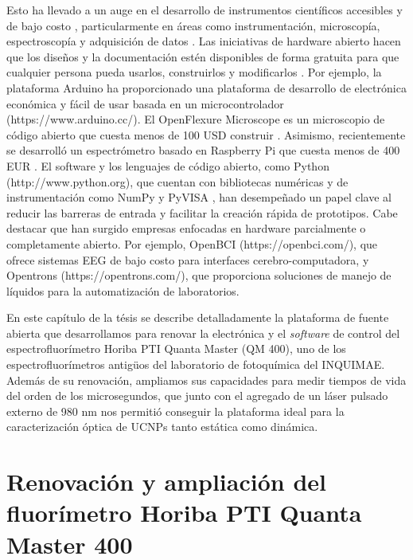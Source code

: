 Esto ha llevado a un auge en el desarrollo de instrumentos científicos accesibles y de bajo costo \cite{wenzel_open_2023, arancio_inequalities_2023}, particularmente en áreas como instrumentación, microscopía, espectroscopía y adquisición de datos \cite{jameson_fluorescent_1989, li_optical_2022, hu_fluorescent_2022}.
Las iniciativas de hardware abierto hacen que los diseños y la documentación estén disponibles de forma gratuita para que cualquier persona pueda usarlos, construirlos y modificarlos \cite{powell_democratizing_2012, oellermann_open_2022}.
Por ejemplo, la plataforma Arduino ha proporcionado una plataforma de desarrollo de electrónica económica y fácil de usar basada en un microcontrolador (https://www.arduino.cc/).
El OpenFlexure Microscope es un microscopio de código abierto que cuesta menos de 100 USD construir \cite{collins_robotic_2020}.
Asimismo, recientemente se desarrolló un espectrómetro basado en Raspberry Pi que cuesta menos de 400 EUR \cite{tunens_optical_2024}.
El software y los lenguajes de código abierto, como Python (http://www.python.org), que cuentan con bibliotecas numéricas y de instrumentación como NumPy \cite{harris_array_2020} y PyVISA \cite{grecco_pyvisa_2023}, han desempeñado un papel clave al reducir las barreras de entrada y facilitar la creación rápida de prototipos.
Cabe destacar que han surgido empresas enfocadas en hardware parcialmente o completamente abierto. Por ejemplo, OpenBCI (https://openbci.com/), que ofrece sistemas EEG de bajo costo para interfaces cerebro-computadora, y Opentrons (https://opentrons.com/), que proporciona soluciones de manejo de líquidos para la automatización de laboratorios.

En este capítulo de la tésis se describe detalladamente la plataforma de fuente abierta que desarrollamos para renovar la electrónica y el \textit{software} de control del espectrofluorímetro Horiba PTI Quanta Master (QM 400), uno de los espectrofluorímetros antigüos del laboratorio de fotoquímica del INQUIMAE.
Además de su renovación, ampliamos sus capacidades para medir tiempos de vida del orden de los microsegundos, que junto con el agregado de un láser pulsado externo de 980 nm nos permitió conseguir la plataforma ideal para la caracterización óptica de UCNPs tanto estática como dinámica.


\section{Renovación y ampliación del fluorímetro Horiba PTI Quanta Master 400}

